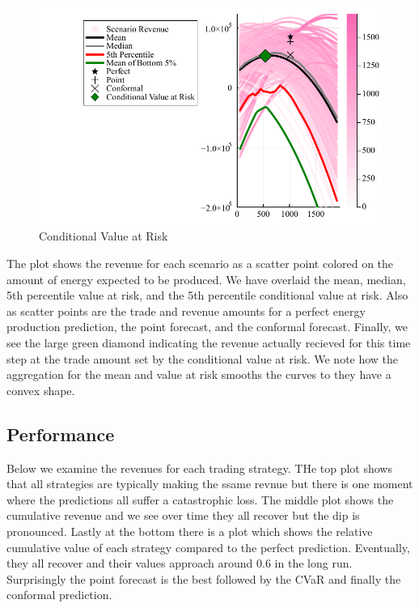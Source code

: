 \documentclass[
  journal,
]{IEEEtran}%
\begin{document}
\begin{figure}

{\centering \includegraphics{EnergyProdConformalLSTM_files/mediabag/EnergyProdConformalLSTM_files/figure-pdf/cvar-plot-example-output-1.pdf}

}

\caption{Conditional Value at Risk}

\end{figure}%

The plot shows the revenue for each scenario as a scatter point colored
on the amount of energy expected to be produced. We have overlaid the
mean, median, 5th percentile value at risk, and the 5th percentile
conditional value at risk. Also as scatter points are the trade and
revenue amounts for a perfect energy production prediction, the point
forecast, and the conformal forecast. Finally, we see the large green
diamond indicating the revenue actually recieved for this time step at
the trade amount set by the conditional value at risk. We note how the
aggregation for the mean and value at risk smooths the curves to they
have a convex shape.

\subsection{Performance}\label{performance-2}

Below we examine the revenues for each trading strategy. THe top plot
shows that all strategies are typically making the ssame revnue but
there is one moment where the predictions all suffer a catastrophic
loss. The middle plot shows the cumulative revenue and we see over time
they all recover but the dip is pronounced. Lastly at the bottom there
is a plot which shows the relative cumulative value of each strategy
compared to the perfect prediction. Eventually, they all recover and
their values approach around 0.6 in the long run. Surprisingly the point
forecast is the best followed by the CVaR and finally the conformal
prediction.
\end{document}
